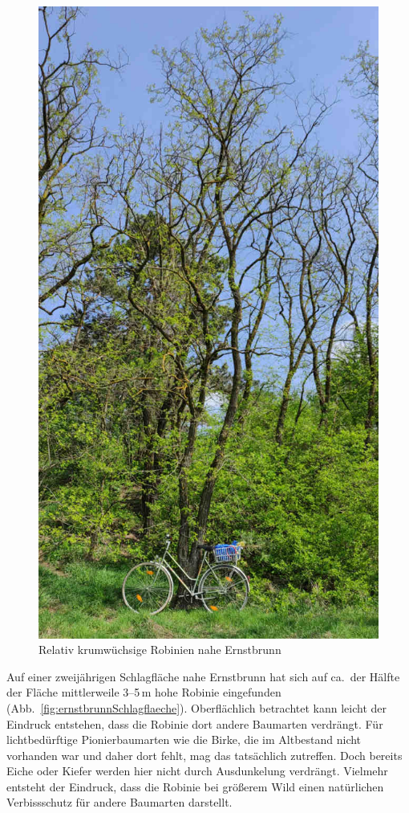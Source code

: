 \documentclass[twocolumn]{scrartcl}
\begin{document}
\begin{figure}[htbp]
  \centering
  \includegraphics[width=.9\linewidth]{./bild/roninieLokal}
  \caption{Relativ krumwüchsige Robinien nahe Ernstbrunn}
  \label{fig:robLokalErnstbrunn}
\end{figure}

Auf einer zweijährigen Schlagfläche nahe Ernstbrunn hat sich auf
ca.\ der Hälfte der Fläche mittlerweile 3--5\,m hohe Robinie
eingefunden (Abb.~\ref{fig:ernstbrunnSchlagflaeche}). Oberflächlich
betrachtet kann leicht der Eindruck entstehen, dass die Robinie dort
andere Baumarten verdrängt. Für lichtbedürftige Pionierbaumarten wie
die Birke, die im Altbestand nicht vorhanden war und daher dort fehlt,
mag das tatsächlich zutreffen. Doch bereits Eiche oder Kiefer werden
hier nicht durch Ausdunkelung verdrängt. Vielmehr entsteht der
Eindruck, dass die Robinie bei größerem Wild einen natürlichen Verbissschutz
für andere Baumarten darstellt.
\end{document}
